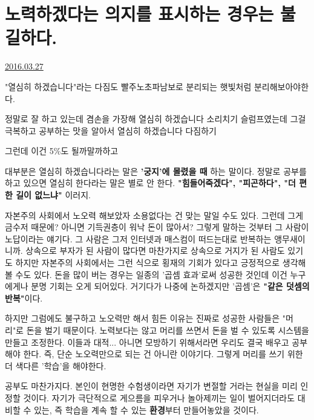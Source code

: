 \section{노력하겠다는 의지를 표시하는 경우는 불길하다.}
\href{https://www.kockoc.com/Apoc/698871}{2016.03.27}

\vspace{5mm}

"열심히 하겠습니다"라는 다짐도 빨주노초파남보로 분리되는 햇빛처럼 분리해보아야한다.
\vspace{5mm}

정말로 잘 하고 있는데 겸손을 가장해 열심히 하겠습니다 소리치기
슬럼프였는데 그걸 극복하고 공부하는 맛을 알아서 열심히 하겠습니다 다짐하기
\vspace{5mm}

그런데 이건 5$\%$도 될까말까하고
\vspace{5mm}

대부분은 열심히 하겠습니다라는 말은 \textbf{'궁지'에 몰렸을 때} 하는 말이다.
정말로 공부를 하고 있으면 열심히 한다라는 말은 별로 안 한다.
\textbf{"힘들어죽겠다", "피곤하다", "더 편한 길이 없느냐"} 이러지.
\vspace{5mm}

자본주의 사회에서 노오력 해보았자 소용없다는 건 맞는 말일 수도 있다.
그런데 그게 금수저 때문에? 아니면 기득권층이 워낙 돈이 많아서?
그렇게 말하는 것부터 그 사람이 노답이라는 얘기다. 그 사람은 그저 인터넷과 매스컴이 떠드는대로 반복하는 앵무새이니까.
상속으로 부자가 된 사람이 많다면 마찬가지로 상속으로 거지가 된 사람도 있기도 하지만
자본주의 사회에서는 그런 식으로 횡재의 기회가 있다고 긍정적으로 생각해 볼 수도 있다.
돈을 많이 버는 경우는 일종의 '곱셈 효과'로써 성공한 것인데 이건 누구에게나 분명 기회는 오게 되어있다.
거기다가 나중에 논하겠지만 '곱셈'은 \textbf{"같은 덧셈의 반복"}이다.
\vspace{5mm}

하지만 그럼에도 불구하고 노오력만 해서 힘든 이유는
진짜로 성공한 사람들은 "머리"로 돈을 벌기 때문이다.
노력보다는 않고 머리를 쓰면서 돈을 벌 수 있도록 시스템을 만들고 조정한다.
이들과 대적... 아니면 모방하기 위해서라면 우리도 결국 배우고 공부해야 한다.
즉, 단순 노오력만으로 되는 건 아니란 이야기다. 그렇게 머리를 쓰기 위한 더 색다른 '학습'을 해야한다.
\vspace{5mm}

공부도 마찬가지다.
본인이 현명한 수험생이라면 자기가 변절할 거라는 현실을 미리 인정할 것이다.
자기가 극단적으로 게으름을 피우거나 놀아제끼는 일이 벌어지더라도 대비할 수 있는,
즉 학습을 계속 할 수 있는 \textbf{환경}부터 만들어놓았을 것이다.
\vspace{5mm}

